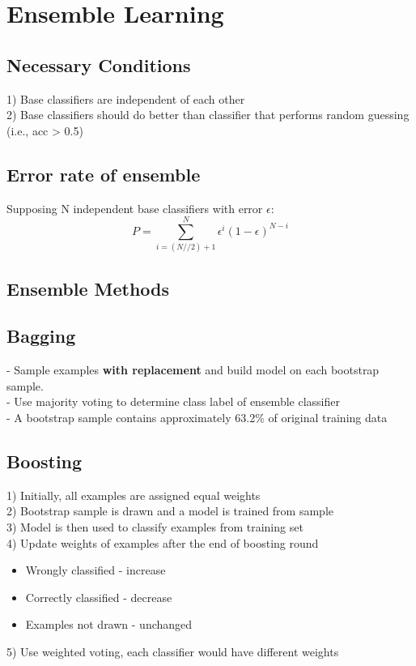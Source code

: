 \section{Ensemble Learning}
\subsection*{Necessary Conditions}
1) Base classifiers are independent of each other\\
2) Base classifiers should do better than classifier that performs random guessing (i.e., acc > 0.5)
\subsection*{Error rate of ensemble}
Supposing N independent base classifiers with error $\epsilon$:\\
\[P = \sum^N_{i = (N//2) + 1} \epsilon^i(1-\epsilon)^{N-i}\]
\subsection*{Ensemble Methods}
\subsection*{Bagging}
- Sample examples \textbf{with replacement} and build model on each bootstrap sample.\\
- Use majority voting to determine class label of ensemble classifier\\
- A bootstrap sample contains approximately 63.2\% of original training data
\subsection*{Boosting}
1) Initially, all examples are assigned equal weights\\
2) Bootstrap sample is drawn and a model is trained from sample\\
3) Model is then used to classify examples from training set\\
4) Update weights of examples after the end of boosting round\\
\begin{itemize}
    \item Wrongly classified - increase
    \item Correctly classified - decrease
    \item Examples not drawn - unchanged
\end{itemize}
5) Use weighted voting, each classifier would have different weights
